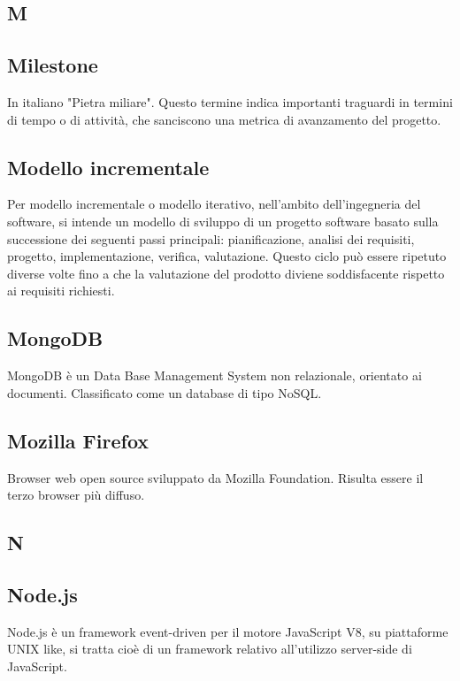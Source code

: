 \newpage

\begin{center}
\Huge\section*{\uppercase{M}}
\end{center}

\subsection*{Milestone}
In italiano "Pietra miliare". Questo termine indica importanti traguardi in termini di
tempo o di attività, che sanciscono una metrica di avanzamento del progetto.

\subsection*{Modello incrementale}
Per modello incrementale o modello iterativo, nell'ambito dell'ingegneria
del software, si intende un modello di sviluppo di un progetto software basato sulla successione
dei seguenti passi principali: pianificazione, analisi dei requisiti, progetto, implementazione,
verifica, valutazione. Questo ciclo può essere ripetuto diverse volte fino a che la valutazione
del prodotto diviene soddisfacente rispetto ai requisiti richiesti.

\subsection*{MongoDB}
MongoDB è un Data Base Management System non relazionale, orientato ai documenti. Classificato come un database di tipo NoSQL.

\subsection*{Mozilla Firefox}
Browser web open source sviluppato da Mozilla Foundation. Risulta essere il terzo
browser più diffuso.

\newpage

\begin{center}
\Huge\section*{\uppercase{N}}
\end{center}

\subsection*{Node.js}
Node.js è un framework event-driven per il motore JavaScript V8, su piattaforme UNIX
like, si tratta cioè di un framework relativo all'utilizzo server-side di JavaScript.

